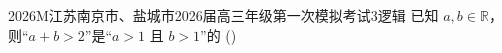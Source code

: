 
\begin{problem}{2026}{M}{江苏南京市、盐城市2026届高三年级第一次模拟考试}{3}{逻辑}
已知 $a,b\in\mathbb{R}$，则“$a+b>2$”是“$a>1$ 且 $b>1$”的
(\hspace{1cm})
\begin{choices}
\end{choices}
\end{problem}